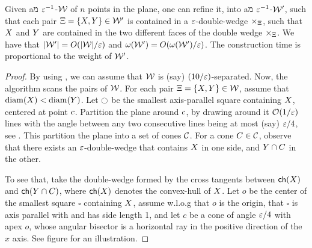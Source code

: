 \documentclass[12pt]{article}%
\begin{document}
\begin{lemma}
    Given aמ $\varepsilon^{-1}$-\SSPD $\mathcal{W}$ of $n$ points in the plane, one
    can refine it, into aמ $\varepsilon^{-1}$-\SSPD $\mathcal{W}'$, such that each
    pair $\Xi = \{ X, Y \} \in \mathcal{W}'$ is contained in a
    $\varepsilon$-double-wedge $\times_\Xi$, such that $X$ and $Y$ are
    contained in the two different faces of the double wedge
    $\times_\Xi$. We have that $|\mathcal{W}'| = O(|\mathcal{W}|/\varepsilon)$ and
    $\WeightX{\WS'} = O(\WeightX{\WS'}/\eps)$. The construction time
    is proportional to the weight of $\mathcal{W}'$.
\end{lemma}
\begin{proof}
    By using , we can assume that $\mathcal{W}$ is (say)
    $(10/\varepsilon)$-separated.  Now, the algorithm scans the pairs of
    $\mathcal{W}$. For each pair $\Xi = \{ X, Y \} \in \mathcal{W}$, assume
    that $\diameterX{\PSX} < \diameterX{\PSY}$. Let $\ocircle$ be the
    smallest axis-parallel square containing $X$, centered at point
    $c$.  Partition the plane around $c$, by drawing around it
    $\mathcal{O}(1/\varepsilon)$ lines with the angle between any two consecutive lines
    being at most (say) $\varepsilon/4$, see . This
    partition the plane into a set of cones $\mathcal{C}$. For a cone
    $C \in \mathcal{C}$, observe that there exists an $\varepsilon$-double-wedge
    that contains $X$ in one side, and $Y \cap C$ in the other.
    
    To see that, take the double-wedge formed by the cross tangents between  $\CHX{\PSX}$ and $\CHX{\PSY \cap C}$, where $\CHX{\PSX}$ denotes the convex-hull of $X$. Let $o$ be the center of the smallest square $\square$ containing $X$, assume w.l.o.g that $o$ is the origin, that $\square$ is axis parallel with and has side length 1, and let $c$ be a cone of angle $\varepsilon / 4$ with apex $o$, whose angular bisector is a horizontal ray in the positive direction of the $x$ axis. See figure  for an illustration.
    

\end{proof}
\end{document}
